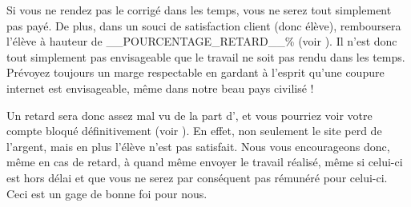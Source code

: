﻿Si vous ne rendez pas le corrigé dans les temps, vous ne serez tout simplement pas payé. De plus, dans un souci de satisfaction client (donc élève), \eDevoir remboursera l'élève à hauteur de __POURCENTAGE_RETARD__\% (voir ). Il n'est donc tout simplement pas envisageable que le travail ne soit pas rendu dans les temps. Prévoyez toujours un marge respectable en gardant à l'esprit qu'une coupure internet est envisageable, même dans notre beau pays civilisé !

Un retard sera donc assez mal vu de la part d'\eDevoir, et vous pourriez voir votre compte bloqué définitivement (voir ). En effet, non seulement le site perd de l'argent, mais en plus l'élève n'est pas satisfait. Nous vous encourageons donc, même en cas de retard, à quand même envoyer le travail réalisé, même si celui-ci est hors délai et que vous ne serez par conséquent pas rémunéré pour celui-ci. Ceci est un gage de bonne foi pour nous.